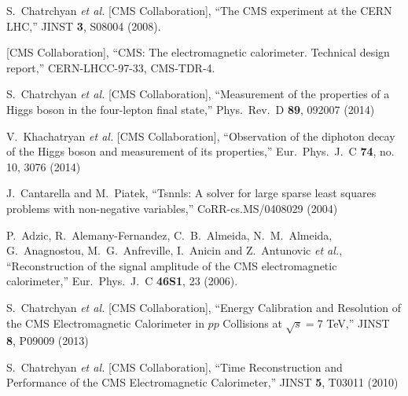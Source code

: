 \documentclass[journal]{IEEEtran}
\begin{document}
%
%
%
\begin{thebibliography}{1}

  S.~Chatrchyan {\it et al.}  [CMS Collaboration], ``The CMS experiment at the CERN LHC,'' JINST {\bf 3}, S08004 (2008).

  [CMS Collaboration], ``CMS: The electromagnetic calorimeter. Technical design report,''  CERN-LHCC-97-33, CMS-TDR-4.

  S.~Chatrchyan {\it et al.}  [CMS Collaboration], ``Measurement of the properties of a Higgs boson in the four-lepton final state,''
  Phys.\ Rev.\ D {\bf 89}, 092007 (2014)

  V.~Khachatryan {\it et al.}  [CMS Collaboration], ``Observation of the diphoton decay of the Higgs boson and measurement of its properties,''  Eur.\ Phys.\ J.\ C {\bf 74}, no. 10, 3076 (2014)

J.~Cantarella and M.~Piatek, ``Tsnnls: A solver for large sparse least squares problems with non-negative variables,'' CoRR-cs.MS/0408029 (2004)

  P.~Adzic, R.~Alemany-Fernandez, C.~B.~Almeida, N.~M.~Almeida, G.~Anagnostou, M.~G.~Anfreville, I.~Anicin and Z.~Antunovic {\it et al.}, ``Reconstruction of the signal amplitude of the CMS electromagnetic calorimeter,''  Eur.\ Phys.\ J.\ C {\bf 46S1}, 23 (2006).

  S.~Chatrchyan {\it et al.}  [CMS Collaboration], ``Energy Calibration and Resolution of the CMS Electromagnetic Calorimeter in $pp$ Collisions at $\sqrt{s} = 7$ TeV,''   JINST {\bf 8}, P09009 (2013)

  S.~Chatrchyan {\it et al.}  [CMS Collaboration], ``Time Reconstruction and Performance of the CMS Electromagnetic Calorimeter,''  JINST {\bf 5}, T03011 (2010)

\end{thebibliography}


\end{document}
